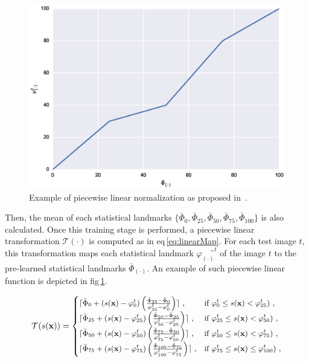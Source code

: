 \begin{enumerate}[leftmargin=*]
\begin{figure}
  \centering
  \includegraphics[width=0.7\linewidth]{3_review/figures/processing/pre-processing/normalization/linear_transform_parts.eps}
  \caption{Example of piecewise linear normalization as proposed
    in~\cite{Nyul2000}.}
  \label{fig:imnorm}
\end{figure}

Then, the mean of each statistical landmarks $\{ \bar{\Phi}_{0},
\bar{\Phi}_{25}, \bar{\Phi}_{50}, \bar{\Phi}_{75}, \bar{\Phi}_{100} \}$ is also
calculated.
Once this training stage is performed, a piecewise linear transformation
$\mathcal{T}(\cdot)$ is computed as in \acs{eq}\,\eqref{eq:linearMap}.
For each test image $t$, this transformation maps each statistical landmark
$\varphi_{(\cdot)}̂^{t}$ of the image $t$ to the pre-learned statistical
landmarks $\bar{\Phi}_{(\cdot)}$.
An example of such piecewise linear function is depicted in
\acs{fig}\,\ref{fig:imnorm}.

\begin{equation}
  \small
  \mathcal{T}(s(\mathbf{x})) =
  \begin{cases}
    \lceil \bar{\Phi}_{0}+( s(\mathbf{x}) - \varphi_{0}^{t} ) \left(
      \frac{\bar{\Phi}_{25} - \bar{\Phi}_{0}}{\varphi_{25}^{t} -
        \varphi_{0}^{t}} \right) \rceil \ , & \text{if $\varphi_{0}^{t} \leq
      s(\mathbf{x})<\varphi_{25}^{t})$} \ , \\
    \lceil \bar{\Phi}_{25}+( s(\mathbf{x}) - \varphi_{25}^{t} ) \left(
      \frac{\bar{\Phi}_{50} - \bar{\Phi}_{25}}{\varphi_{50}^{t} -
        \varphi_{25}^{t}} \right) \rceil \ , & \text{if $\varphi_{25}^{t} \leq
      s(\mathbf{x})<\varphi_{50}^{t})$} \ , \\
    \lceil \bar{\Phi}_{50}+( s(\mathbf{x}) - \varphi_{50}^{t} ) \left(
      \frac{\bar{\Phi}_{75} - \bar{\Phi}_{50}}{\varphi_{75}^{t} -
        \varphi_{50}^{t}} \right) \rceil \ , & \text{if $\varphi_{50}^{t} \leq
      s(\mathbf{x})<\varphi_{75}^{t})$} \ , \\
    \lceil \bar{\Phi}_{75}+( s(\mathbf{x}) - \varphi_{75}^{t} ) \left(
      \frac{\bar{\Phi}_{100} - \bar{\Phi}_{75}}{\varphi_{100}^{t} -
        \varphi_{75}^{t}} \right) \rceil \ , & \text{if $\varphi_{75}^{t} \leq
      s(\mathbf{x})\leq \varphi_{100}^{t})$} \ ,
  \end{cases}
  \label{eq:linearMap}
\end{equation}


\end{enumerate}
